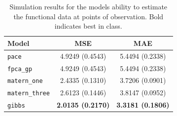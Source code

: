 \begin{table}[b]
	\caption[Simulation results for Scenario D on test data.]{Simulation results for the models ability to estimate the functional data at points of observation. Bold indicates best in class.}
	\centering
	\label{tab:test_D}
	\begin{tabular}{lcc}
		\toprule
		\textbf{Model} & \textbf{MSE} & \textbf{MAE} \\
		\midrule
		\verb*|pace| & 4.9249 (0.4543)& 5.4494 (0.2338)\\
		\verb*|fpca_gp| & 4.9249 (0.4543)& 5.4494 (0.2338)\\
		\verb*|matern_one| & 2.4335	(0.1310) & 3.7206 (0.0901) \\
		\verb*|matern_three| & 2.6123 (0.1446)& 3.8147 (0.0952) \\
		\verb*|gibbs| & \textbf{2.0135 (0.2170)} & \textbf{3.3181 (0.1806)}\\
		\bottomrule
	\end{tabular}
\end{table}

